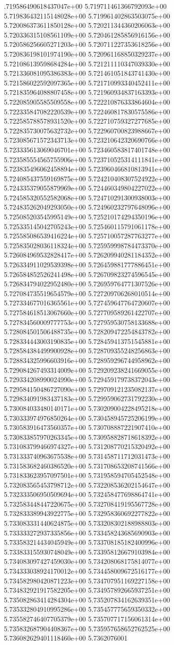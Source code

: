 .719586490618437047e+00	5.719711461366792093e+00	5.719836432115148028e+00	5.719961402863503075e+00	5.720086373611850128e+00	5.720211344360206063e+00	5.720336315108561109e+00	5.720461285856916156e+00	5.720586256605271203e+00	5.720711227353618256e+00	5.720836198101974190e+00	5.720961168850329237e+00	5.721086139598684284e+00	5.721211110347039330e+00	5.721336081095386383e+00	5.721461051843741430e+00	5.721586022592097365e+00	5.721710993340452411e+00	5.721835964088807458e+00	5.721960934837163393e+00	5.722085905585509558e+00	5.722210876333864604e+00	5.722335847082220539e+00	5.722460817830575586e+00	5.722585788578931520e+00	5.722710759327277685e+00	5.722835730075632732e+00	5.722960700823988667e+00	5.723085671572343713e+00	5.723210642320690766e+00	5.723335613069046701e+00	5.723460583817401748e+00	5.723585554565755906e+00	5.723710525314111841e+00	5.723835496062458894e+00	5.723960466810813941e+00	5.724085437559169875e+00	5.724210408307524922e+00	5.724335379055879969e+00	5.724460349804227022e+00	5.724585320552582068e+00	5.724710291300938003e+00	5.724835262049293050e+00	5.724960232797648096e+00	5.725085203545995149e+00	5.725210174294350196e+00	5.725335145042705243e+00	5.725460115791061178e+00	5.725585086539416224e+00	5.725710057287763277e+00	5.725835028036118324e+00	5.725959998784473370e+00	5.726084969532828417e+00	5.726209940281184352e+00	5.726334911029539398e+00	5.726459881777886451e+00	5.726584852526241498e+00	5.726709823274596545e+00	5.726834794022952480e+00	5.726959764771307526e+00	5.727084735519654579e+00	5.727209706268010514e+00	5.727334677016365561e+00	5.727459647764720607e+00	5.727584618513067660e+00	5.727709589261422707e+00	5.727834560009777753e+00	5.727959530758133688e+00	5.728084501506488735e+00	5.728209472254843782e+00	5.728334443003190835e+00	5.728459413751545881e+00	5.728584384499900928e+00	5.728709355248256863e+00	5.728834325996603916e+00	5.728959296744958962e+00	5.729084267493314009e+00	5.729209238241669055e+00	5.729334208990024990e+00	5.729459179738372043e+00	5.729584150486727090e+00	5.729709121235082137e+00	5.729834091983437183e+00	5.729959062731792230e+00	5.730084033480140171e+00	5.730209004228495218e+00	5.730333974976850264e+00	5.730458945725206199e+00	5.730583916473560357e+00	5.730708887221907410e+00	5.730833857970263345e+00	5.730958828718618392e+00	5.731083799466974327e+00	5.731208770215320492e+00	5.731333740963675538e+00	5.731458711712031473e+00	5.731583682460386520e+00	5.731708653208741566e+00	5.731833623957097501e+00	5.731958594705452548e+00	5.732083565453798712e+00	5.732208536202154647e+00	5.732333506950509694e+00	5.732458477698864741e+00	5.732583448447220675e+00	5.732708419195567728e+00	5.732833389943922775e+00	5.732958360692277822e+00	5.733083331440624875e+00	5.733208302188988803e+00	5.733333272937335856e+00	5.733458243685690903e+00	5.733583214434045949e+00	5.733708185182400996e+00	5.733833155930748049e+00	5.733958126679103984e+00	5.734083097427459030e+00	5.734208068175814077e+00	5.734333038924170012e+00	5.734458009672516177e+00	5.734582980420871223e+00	5.734707951169227158e+00	5.734832921917582205e+00	5.734957892665937251e+00	5.735082863414284304e+00	5.735207834162639351e+00	5.735332804910995286e+00	5.735457775659350332e+00	5.735582746407705379e+00	5.735707717156061314e+00	5.735832687904408367e+00	5.735957658652762525e+00	5.736082629401118460e+00	5.7362076001
